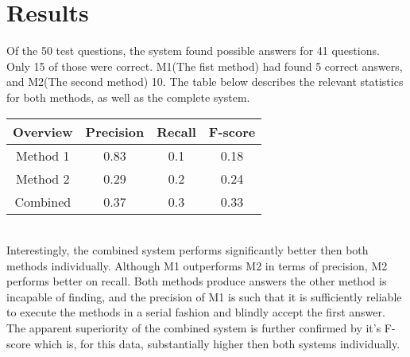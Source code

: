 \documentclass[a4paper,11pt]{article}
\begin{document}
\section{Results}
Of the 50 test questions, the system found possible answers for 41 questions. Only 15 of those were correct. M1(The fist method) had found 5 correct answers, and M2(The second method) 10. The table below describes the relevant statistics for both methods, as well as the complete system.\vspace{3mm}\\%
\begin{tabular}{|c|c|c|c|}
\hline 
\textbf{Overview} & Precision & Recall & F-score \\ 
\hline 
Method 1 & 0.83 & 0.1 & 0.18 \\ 
\hline 
Method 2 & 0.29 & 0.2 & 0.24 \\ 
\hline 
Combined & 0.37 & 0.3 & 0.33 \\ 
\hline 
\end{tabular}\vspace{3mm}\\
Interestingly, the combined system performs significantly better then both methods individually. Although M1 outperforms M2 in terms of precision, M2 performs better on recall. Both methods produce answers the other method is incapable of finding, and the precision of M1 is such that it is sufficiently reliable to execute the methods in a serial fashion and blindly accept the first answer. The apparent superiority of the combined system is further confirmed by it's F-score which is, for this data, substantially higher then both systems individually.\vspace{2mm}\\
\end{document}
